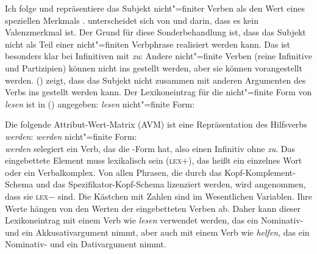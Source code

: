 \noindent
Ich folge
\citet[Abschnitt~3.1.1]{Kiss95a} und repräsentiere das Subjekt nicht"=finiter Verben als den Wert eines
speziellen Merkmals \subj. \subj unterscheidet sich von \spr und \comps darin, dass es kein Valenzmerkmal ist. Der
Grund für diese Sonderbehandlung ist, dass das Subjekt nicht als Teil einer nicht"=finiten
Verbphrase realisiert werden kann. Das ist besonders klar bei Infinitiven mit \emph{zu}:
\eal
{}
\zl
Andere nicht"=finite Verben (reine Infinitive und Partizipien) können nicht ins \nf gestellt werden, aber sie
können vorangestellt werden. () zeigt, dass das Subjekt nicht zusammen mit anderen Argumenten
des Verbs ins \vf gestellt werden kann.
\eal
{}
\zl
Der Lexikoneintrag für die nicht"=finite Form von \emph{lesen} ist in () angegeben:
\ea
\emph{lesen} nicht"=finite Form:\\
\z

\noindent
Die folgende Attribut-Wert-Matrix (AVM) ist eine Repräsentation des Hilfsverbs \emph{werden}:
\eas
\emph{werden} nicht"=finite Form:\\
\zs
\emph{werden} selegiert ein Verb, das die -Form hat, also einen Infinitiv ohne
\emph{zu}. Das eingebettete Element muss lexikalisch sein (\textsc{lex}+), das heißt ein einzelnes Wort oder ein
Verbalkomplex. Von allen Phrasen, die durch das Kopf-Komplement-Schema und das Spezifikator-Kopf-Schema
lizenziert werden, wird angenommen, dass sie \textsc{lex}$-$ sind.
Die Kästchen mit Zahlen sind im Wesentlichen Variablen. Ihre Werte hängen von den Werten der
eingebetteten Verben ab. Daher kann dieser Lexikoneintrag mit einem Verb wie \emph{lesen}
verwendet werden, das ein Nominativ- und ein Akkusativargument nimmt, aber auch mit einem Verb wie \emph{helfen},
das ein Nominativ- und ein Dativargument nimmt.

